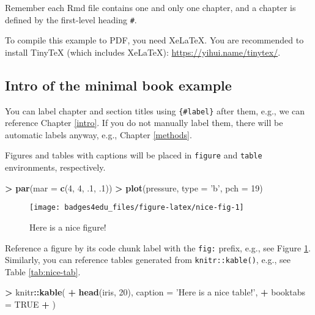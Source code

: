 \documentclass[]{book}
\newenvironment{Shaded}{\begin{snugshade}}{\end{snugshade}}
\newcommand{\KeywordTok}[1]{\textcolor[rgb]{0.13,0.29,0.53}{\textbf{#1}}}
\newcommand{\DataTypeTok}[1]{\textcolor[rgb]{0.13,0.29,0.53}{#1}}
\newcommand{\DecValTok}[1]{\textcolor[rgb]{0.00,0.00,0.81}{#1}}
\newcommand{\StringTok}[1]{\textcolor[rgb]{0.31,0.60,0.02}{#1}}
\newcommand{\OtherTok}[1]{\textcolor[rgb]{0.56,0.35,0.01}{#1}}
\newcommand{\OperatorTok}[1]{\textcolor[rgb]{0.81,0.36,0.00}{\textbf{#1}}}
\newcommand{\NormalTok}[1]{#1}
\theoremstyle{definition}
\theoremstyle{definition}
\theoremstyle{definition}
\theoremstyle{remark}
\begin{document}
Remember each Rmd file contains one and only one chapter, and a chapter
is defined by the first-level heading \texttt{\#}.

To compile this example to PDF, you need XeLaTeX. You are recommended to
install TinyTeX (which includes XeLaTeX):
\url{https://yihui.name/tinytex/}.

\subsection{Intro of the minimal book
example}\label{intro-of-the-minimal-book-example}

You can label chapter and section titles using \texttt{\{\#label\}}
after them, e.g., we can reference Chapter \ref{intro}. If you do not
manually label them, there will be automatic labels anyway, e.g.,
Chapter \ref{methods}.

Figures and tables with captions will be placed in \texttt{figure} and
\texttt{table} environments, respectively.

\begin{Shaded}
\begin{Highlighting}[]
\OperatorTok{>}\StringTok{ }\KeywordTok{par}\NormalTok{(}\DataTypeTok{mar =} \KeywordTok{c}\NormalTok{(}\DecValTok{4}\NormalTok{, }\DecValTok{4}\NormalTok{, .}\DecValTok{1}\NormalTok{, .}\DecValTok{1}\NormalTok{))}
\OperatorTok{>}\StringTok{ }\KeywordTok{plot}\NormalTok{(pressure, }\DataTypeTok{type =} \StringTok{'b'}\NormalTok{, }\DataTypeTok{pch =} \DecValTok{19}\NormalTok{)}
\end{Highlighting}
\end{Shaded}

\begin{figure}

{\centering \texttt{[image: badges4edu\_files/figure-latex/nice-fig-1]} 

}

\caption{Here is a nice figure!}\label{fig:nice-fig}
\end{figure}

Reference a figure by its code chunk label with the \texttt{fig:}
prefix, e.g., see Figure \ref{fig:nice-fig}. Similarly, you can
reference tables generated from \texttt{knitr::kable()}, e.g., see Table
\ref{tab:nice-tab}.

\begin{Shaded}
\begin{Highlighting}[]
\OperatorTok{>}\StringTok{ }\NormalTok{knitr}\OperatorTok{::}\KeywordTok{kable}\NormalTok{(}
\OperatorTok{+}\StringTok{   }\KeywordTok{head}\NormalTok{(iris, }\DecValTok{20}\NormalTok{), }\DataTypeTok{caption =} \StringTok{'Here is a nice table!'}\NormalTok{,}
\OperatorTok{+}\StringTok{   }\DataTypeTok{booktabs =} \OtherTok{TRUE}
\OperatorTok{+}\StringTok{ }\NormalTok{)}
\end{Highlighting}
\end{Shaded}
\end{document}
